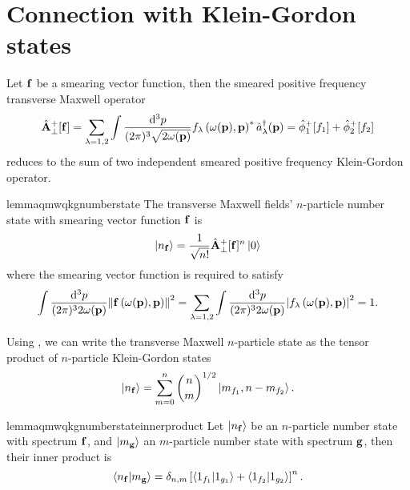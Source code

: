\section{Connection with Klein-Gordon states}

\begin{corollary}\label{thm:qmw_qkg}
	Let $\vb{f}$ be a smearing vector function, then the smeared positive frequency transverse Maxwell operator
	\begin{equation}
		\hat{\vb{A}}_\perp^+[\vb{f}]
		=
		\sum_{\lambda=1,2}
		\int\frac{\dd[3]{p}}{(2\pi)^3\sqrt{2\omega(\vb{p})}}
		f_\lambda\left(\omega(\vb{p}),\vb{p}\right)^*
		\hat{a}_\lambda^\dagger(\vb{p})
		=
		\hat\phi_1^+[f_1]
		+
		\hat\phi_2^+[f_2]
	\end{equation}
	 reduces to the sum of two independent smeared positive frequency Klein-Gordon operator.
\end{corollary}
\begin{restatable}{lemma}{qmwqkgnumberstate}\label{thm:qmw_qkg_number_state}
	The transverse Maxwell fields' $n$-particle number state with smearing vector function $\vb{f}$ is
	\begin{equation}
		\label{eq:qmw_number_state}
		\ket{n_{\vb{f}}}
		=
		\frac{1}{\sqrt{n!}}
		\hat{\vb{A}}_\perp^+[\vb{f}]^n
		\ket{0}
	\end{equation}
	where the smearing vector function is required to satisfy~\cite[p.~175]{Itzykson2012}
	\begin{equation}
		\int\frac{\dd[3]{p}}{(2\pi)^32\omega(\vb{p})}
		\norm{\vb{f}\left(\omega(\vb{p}),\vb{p}\right)}^2
		=
		\sum_{\lambda=1,2}
		\int\frac{\dd[3]{p}}{(2\pi)^32\omega(\vb{p})}
		\abs{f_\lambda\left(\omega(\vb{p}),\vb{p}\right)}^2
		=
		1
		.
	\end{equation}
\end{restatable}
\begin{corollary}
	Using , we can write the transverse Maxwell $n$-particle state as the tensor product of $n$-particle Klein-Gordon states
	\begin{equation}
		\ket{n_{\vb{f}}}
		=
		\sum^n_{m=0}
		\binom{n}{m}^{1/2}
		\ket{m_{f_1},n-m_{f_2}}
		.
	\end{equation}
\end{corollary}
\begin{restatable}{lemma}{qmwqkgnumberstateinnerproduct}\label{thm:qmw_qkg_number_state_inner_product}
	Let $\ket{n_{\vb{f}}}$ be an $n$-particle number state with spectrum $\vb{f}$, and $\ket{m_{\vb{g}}}$ an $m$-particle number state with spectrum $\vb{g}$, then their inner product is
	\begin{equation}
		\braket{n_{\vb{f}}}{m_{\vb{g}}}
		=
		\delta_{n,m}
		\left[
			\braket{1_{f_1}}{1_{g_1}}
			+
			\braket{1_{f_2}}{1_{g_2}}
		\right]^n
		.
	\end{equation}
\end{restatable}

